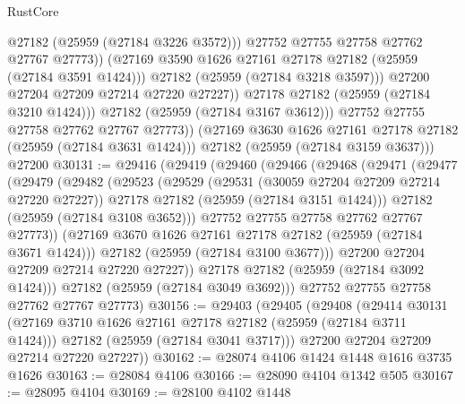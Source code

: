 \begin{lexlean}{RustCore}
\begin{coremodule}
                          @27182
                          (@25959 (@27184 @3226 @3572)))
                        @27752
                        @27755
                        @27758
                        @27762
                        @27767
                        @27773))
                    (@27169 @3590 @1626 @27161 @27178 @27182 (@25959 (@27184 @3591 @1424)))
                    @27182
                    (@25959 (@27184 @3218 @3597)))
                  @27200
                  @27204
                  @27209
                  @27214
                  @27220
                  @27227))
              @27178
              @27182
              (@25959 (@27184 @3210 @1424)))
            @27182
            (@25959 (@27184 @3167 @3612)))
          @27752
          @27755
          @27758
          @27762
          @27767
          @27773))
      (@27169 @3630 @1626 @27161 @27178 @27182 (@25959 (@27184 @3631 @1424)))
      @27182
      (@25959 (@27184 @3159 @3637)))
    @27200
@30131 := @29416
    (@29419
      (@29460
        (@29466
          (@29468
            (@29471
              (@29477
                (@29479
                  (@29482
                    (@29523
                      (@29529
                        (@29531 (@30059 @27204 @27209 @27214 @27220 @27227))
                        @27178
                        @27182
                        (@25959 (@27184 @3151 @1424)))
                      @27182
                      (@25959 (@27184 @3108 @3652)))
                    @27752
                    @27755
                    @27758
                    @27762
                    @27767
                    @27773))
                (@27169 @3670 @1626 @27161 @27178 @27182 (@25959 (@27184 @3671 @1424)))
                @27182
                (@25959 (@27184 @3100 @3677)))
              @27200
              @27204
              @27209
              @27214
              @27220
              @27227))
          @27178
          @27182
          (@25959 (@27184 @3092 @1424)))
        @27182
        (@25959 (@27184 @3049 @3692)))
      @27752
      @27755
      @27758
      @27762
      @27767
      @27773)
@30156 := @29403
    (@29405
      (@29408
        (@29414
          @30131
          (@27169 @3710 @1626 @27161 @27178 @27182 (@25959 (@27184 @3711 @1424)))
          @27182
          (@25959 (@27184 @3041 @3717)))
        @27200
        @27204
        @27209
        @27214
        @27220
        @27227))
@30162 := @28074 @4106 @1424 @1448 @1616 @3735 @1626
@30163 := @28084 @4106
@30166 := @28090 @4104 @1342 @505
@30167 := @28095 @4104
@30169 := @28100 @4102 @1448

\end{coremodule}
\end{lexlean}
